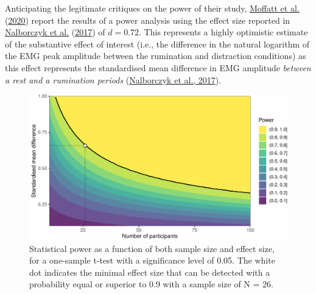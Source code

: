 \documentclass[
  english,
  man, donotrepeattitle,floatsintext]{apa6}
\begin{document}
Anticipating the legitimate critiques on the power of their study, \protect\hyperlink{ref-moffatt_inner_2020}{Moffatt et al.} (\protect\hyperlink{ref-moffatt_inner_2020}{2020}) report the results of a power analysis using the effect size reported in \protect\hyperlink{ref-nalborczyk_orofacial_2017}{Nalborczyk et al.} (\protect\hyperlink{ref-nalborczyk_orofacial_2017}{2017}) of \(d = 0.72\). This represents a highly optimistic estimate of the substantive effect of interest (i.e., the difference in the natural logarithm of the EMG peak amplitude between the rumination and distraction conditions) as this effect represents the standardised mean difference in EMG amplitude \emph{between a rest and a rumination periods} (\protect\hyperlink{ref-nalborczyk_orofacial_2017}{Nalborczyk et al., 2017}).

\begin{figure}[!htb]

{\centering \includegraphics[width=1\linewidth]{manuscript_files/figure-latex/power-1} 

}

\caption{Statistical power as a function of both sample size and effect size, for a one-sample t-test with a significance level of 0.05. The white dot indicates the minimal effect size that can be detected with a probability equal or superior to 0.9 with a sample size of N = 26.}\label{fig:power}
\end{figure}
\end{document}
